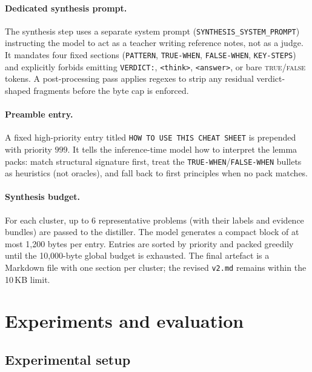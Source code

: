 \documentclass{article}
\begin{document}
\paragraph{Dedicated synthesis prompt.} The synthesis step uses a separate system prompt (\texttt{SYNTHESIS\_SYSTEM\_PROMPT}) instructing the model to act as a teacher writing reference notes, not as a judge. It mandates four fixed sections (\texttt{PATTERN}, \texttt{TRUE-WHEN}, \texttt{FALSE-WHEN}, \texttt{KEY-STEPS}) and explicitly forbids emitting \texttt{VERDICT:}, \texttt{<think>}, \texttt{<answer>}, or bare \textsc{true}/\textsc{false} tokens. A post-processing pass applies regexes to strip any residual verdict-shaped fragments before the byte cap is enforced.

\paragraph{Preamble entry.} A fixed high-priority entry titled \texttt{HOW TO USE THIS CHEAT SHEET} is prepended with priority $999$. It tells the inference-time model how to interpret the lemma packs: match structural signature first, treat the \texttt{TRUE-WHEN}/\texttt{FALSE-WHEN} bullets as heuristics (not oracles), and fall back to first principles when no pack matches.

\paragraph{Synthesis budget.} For each cluster, up to 6 representative problems (with their labels and evidence bundles) are passed to the distiller. The model generates a compact block of at most 1{,}200 bytes per entry. Entries are sorted by priority and packed greedily until the 10{,}000-byte global budget is exhausted. The final artefact is a Markdown file with one section per cluster; the revised \texttt{v2.md} remains within the 10\,KB limit.

\section{Experiments and evaluation}
\label{sec:experiments}

\subsection{Experimental setup}
\end{document}
